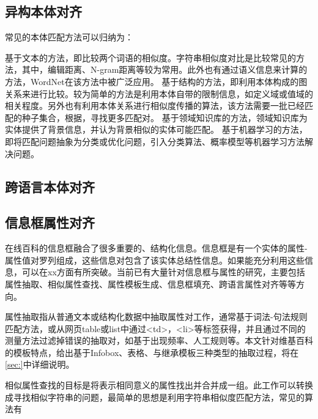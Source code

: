 \subsection{异构本体对齐}
常见的本体匹配方法可以归纳为：

{\heiti 基于文本的方法}，即比较两个词语的相似度。字符串相似度对比是比较常见的方法，其中，编辑距离、N-gram距离等较为常用。此外也有通过语义信息来计算的方法，WordNet\cite{miller1995wordnet}在该方法中被广泛应用。
{\heiti 基于结构的方法\cite{hu2008matching}}，即利用本体构成的图关系来进行比较。较为简单的方法是利用本体自带的限制信息，如定义域或值域的相关程度。另外也有利用本体关系进行相似度传播的算法，该方法需要一批已经匹配的种子集合，根据，寻找更多匹配对。
{\heiti 基于领域知识库的方法\cite{ponzetto2009large,gligorov2007using}}，领域知识库为实体提供了背景信息，并认为背景相似的实体可能匹配。
{\heiti 基于机器学习的方法\cite{niepert2010probabilistic,albagli2012markov}}，即将匹配问题抽象为分类或优化问题，引入分类算法、概率模型等机器学习方法解决问题。


\subsection{跨语言本体对齐}

\subsection{信息框属性对齐}
\label{sec:property-research}
在线百科的信息框融合了很多重要的、结构化信息。信息框是有一个实体的属性-属性值对罗列组成，这些信息对包含了该实体总结性信息。如果能充分利用这些信息，可以在xx方面有所突破。当前已有大量针对信息框与属性的研究，主要包括属性抽取\cite{}、相似属性查找、属性模板生成、信息框填充、跨语言属性对齐等等方向。

{\heiti 属性抽取}指从普通文本或结构化数据中抽取属性对工作，通常基于词法-句法规则匹配方法\cite{pacsca2007role,lee2013attribute}，或从网页table或list中通过<td>，<li>等标签获得\cite{crestan2010web}，并且通过不同的测量方法过滤掉错误的抽取对，如基于出现频率\cite{pacsca2007role}、人工规则\cite{lee2013attribute}等。本文针对维基百科的模板特点，给出基于Infobox、表格、与继承模板三种类型的抽取过程，将在\ref{sec:}中详细说明。

{\heiti 相似属性查找}的目标是将表示相同意义的属性找出并合并成一组。此工作可以转换成寻找相似字符串的问题，最简单的思想是利用字符串相似度匹配方法，常见的算法有

